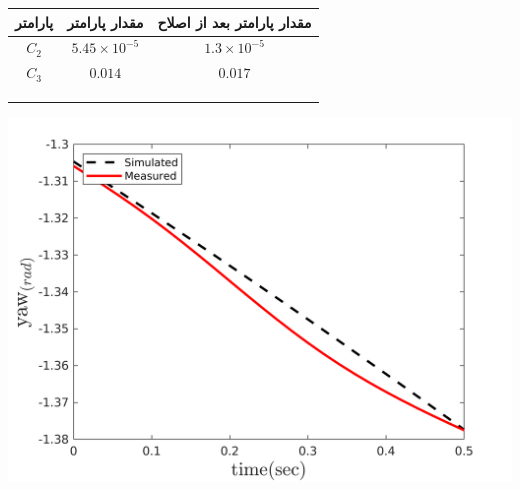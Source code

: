\begin{minipage}[H]{\linewidth}
	\hfill
	\begin{minipage}[b]{0.49\linewidth}
		\centering
		\begin{tabular}{ccc}\hline
			پارامتر & مقدار پارامتر  & مقدار پارامتر بعد از اصلاح
			\\ \hline
			$C_2$  & $5.45\times10^{-5}$ & $1.3\times10^{-5}$ \\
			$C_3$  & $0.014$ & $0.017$ \\ \hline
			\\\\\\
		\end{tabular}
	\end{minipage}
	\begin{minipage}[b]{0.48\linewidth}
		\centering
		\includegraphics[width=1\linewidth]{../Figures/RCP/yaw_parameter_estimation/RCP_yaw_S2.png}
	\end{minipage}
\end{minipage}
